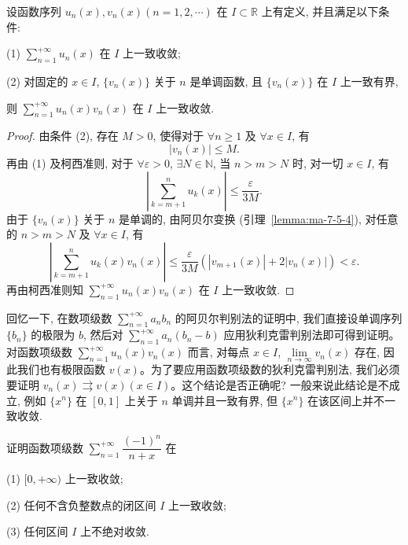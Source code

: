 \begin{theorem}[{阿贝尔判别法}]\label{theorem:ma-10-3-5}
设函数序列 $u_n(x),v_n(x)(n=1,2,\cdots)$ 在 $I\subset\mathbb R$ 上有定义, 并且满足以下条件:

(1) $\sum\limits_{n=1}^{+\infty}u_n(x)$ 在 $I$ 上一致收敛;

(2) 对固定的 $x\in I$, $\{v_n(x)\}$ 关于 $n$ 是单调函数, 且 $\{v_n(x)\}$ 在 $I$ 上一致有界,

则 $\sum\limits_{n=1}^{+\infty}u_n(x)v_n(x)$ 在 $I$ 上一致收敛.
\end{theorem}


\begin{proof}
由条件 (2), 存在 $M>0$, 使得对于 $\forall n\geq1$ 及 $\forall x\in I$, 有
\[
  |v_n(x)|\leq M.
\]
再由 (1) 及柯西准则, 对于 $\forall\varepsilon>0$, $\exists N\in\mathbb N$, 当 $n>m>N$ 时, 对一切 $x\in I$, 有
\[
  \left|\sum_{k=m+1}^n u_k(x)\right|\leq\frac{\varepsilon}{3M}.
\]
由于 $\{v_n(x)\}$ 关于 $n$ 是单调的, 由阿贝尔变换 (引理~\ref{lemma:ma-7-5-4}), 对任意的 $n>m>N$ 及 $\forall x\in I$, 有
\[
  \left|\sum_{k=m+1}^n u_k(x)v_n(x)\right|
  \leq\frac{\varepsilon}{3M}(|v_{m+1}(x)|+2|v_n(x)|)<\varepsilon.
\]
再由柯西准则知 $\sum\limits_{n=1}^{+\infty}u_n(x)v_n(x)$ 在 $I$ 上一致收敛.
\end{proof}


回忆一下, 在数项级数 $\sum\limits_{n=1}^{+\infty}a_nb_n$ 的阿贝尔判别法的证明中, 我们直接设单调序列 $\{b_n\}$ 的极限为 $b$, 然后对 $\sum\limits_{n=1}^{+\infty}a_n(b_n-b)$ 应用狄利克雷判别法即可得到证明。对函数项级数 $\sum\limits_{n=1}^{+\infty}u_n(x)v_n(x)$ 而言, 对每点 $x\in I$, $\lim\limits_{n\to\infty}v_n(x)$ 存在, 因此我们也有极限函数 $v(x)$。为了要应用函数项级数的狄利克雷判别法, 我们必须要证明 $v_n(x)\rightrightarrows v(x)(x\in I)$。这个结论是否正确呢? 一般来说此结论是不成立, 例如 $\{x^n\}$ 在 $[0,1]$ 上关于 $n$ 单调并且一致有界, 但 $\{x^n\}$ 在该区间上并不一致收敛.

\begin{example}\label{example:ma-10-3-6}
证明函数项级数 $\sum\limits_{n=1}^{+\infty}\dfrac{(-1)^n}{n+x}$ 在

(1) $[0,+\infty)$ 上一致收敛;

(2) 任何不含负整数点的闭区间 $I$ 上一致收敛;

(3) 任何区间 $I$ 上不绝对收敛.
\end{example}



